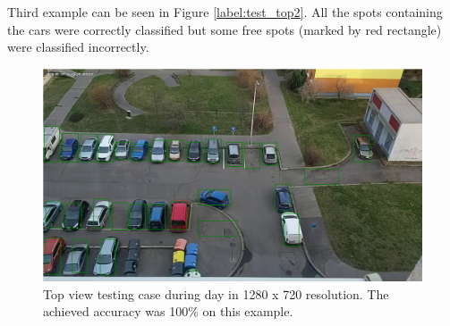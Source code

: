\documentclass[thesis=M,english]{FITthesis}[2019/03/06]
\begin{document}
Third example can be seen in Figure \ref{label:test_top2}. All the spots containing the cars were correctly classified but some free spots (marked by red rectangle) were classified incorrectly. 

\begin{figure}[ht!]
	\centering
	\includegraphics[width=\linewidth]{imgs/test-topview.png}
	\caption{Top view testing case during day in 1280 x 720 resolution. The achieved accuracy was 100\% on this example.}
	\label{label:test_top_day}
\end{figure}
\end{document}
